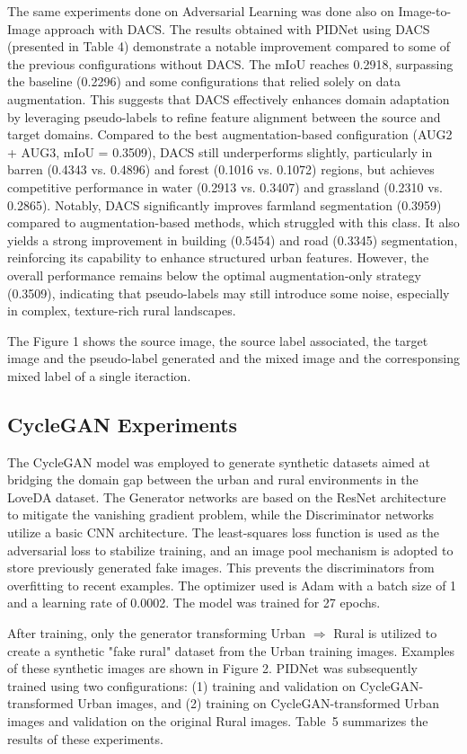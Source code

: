 \documentclass[10pt,twocolumn,letterpaper]{article}
\begin{document}
The same experiments done on Adversarial Learning was done also on Image-to-Image approach with DACS. The results obtained with PIDNet using DACS (presented in Table 4) demonstrate a notable improvement compared to some of the previous configurations without DACS. The mIoU reaches 0.2918, surpassing the baseline (0.2296) and some configurations that relied solely on data augmentation. This suggests that DACS effectively enhances domain adaptation by leveraging pseudo-labels to refine feature alignment between the source and target domains. Compared to the best augmentation-based configuration (AUG2 + AUG3, mIoU = 0.3509), DACS still underperforms slightly, particularly in barren (0.4343 vs. 0.4896) and forest (0.1016 vs. 0.1072) regions, but achieves competitive performance in water (0.2913 vs. 0.3407) and grassland (0.2310 vs. 0.2865).
Notably, DACS significantly improves farmland segmentation (0.3959) compared to augmentation-based methods, which struggled with this class. It also yields a strong improvement in building (0.5454) and road (0.3345) segmentation, reinforcing its capability to enhance structured urban features. However, the overall performance remains below the optimal augmentation-only strategy (0.3509), indicating that pseudo-labels may still introduce some noise, especially in complex, texture-rich rural landscapes. 

The Figure 1 shows the source image, the source label associated, the target image and the pseudo-label generated and the mixed image and the corresponsing mixed label of a single iteraction. 

\subsection{CycleGAN Experiments}

The CycleGAN model was employed to generate synthetic datasets aimed at bridging the domain gap between the urban and rural environments in the LoveDA dataset. The Generator networks are based on the ResNet architecture to mitigate the vanishing gradient problem, while the Discriminator networks utilize a basic CNN architecture. The least-squares loss function is used as the adversarial loss to stabilize training, and an image pool mechanism is adopted to store previously generated fake images. This prevents the discriminators from overfitting to recent examples. The optimizer used is Adam with a batch size of 1 and a learning rate of 0.0002. The model was trained for 27 epochs. 

After training, only the generator transforming Urban $\Rightarrow$ Rural is utilized to create a synthetic "fake rural" dataset from the Urban training images. Examples of these synthetic images are shown in Figure 2. PIDNet was subsequently trained using two configurations: (1) training and validation on CycleGAN-transformed Urban images, and (2) training on CycleGAN-transformed Urban images and validation on the original Rural images. Table~5 summarizes the results of these experiments.
\end{document}
